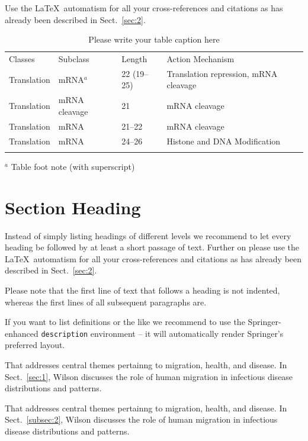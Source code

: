 \documentclass[graybox]{svmult}
\begin{document}
 Use the \LaTeX\ automatism for all your cross-refer\-ences and citations as has already been described in Sect.~\ref{sec:2}.
%
%
\begin{table}
\caption{Please write your table caption here}
\label{tab:1}       %
%
%
\begin{tabular}{p{2cm}p{2.4cm}p{2cm}p{4.9cm}}
\hline\noalign{\smallskip}
Classes & Subclass & Length & Action Mechanism  \\
\noalign{\smallskip}\svhline\noalign{\smallskip}
Translation & mRNA$^a$  & 22 (19--25) & Translation repression, mRNA cleavage\\
Translation & mRNA cleavage & 21 & mRNA cleavage\\
Translation & mRNA  & 21--22 & mRNA cleavage\\
Translation & mRNA  & 24--26 & Histone and DNA Modification\\
\noalign{\smallskip}\hline\noalign{\smallskip}
\end{tabular}
$^a$ Table foot note (with superscript)
\end{table}
%
\section{Section Heading}
\label{sec:3}
Instead of simply listing headings of different levels we recommend to
let every heading be followed by at least a short passage of text.
Further on please use the \LaTeX\ automatism for all your
cross-references and citations as has already been described in
Sect.~\ref{sec:2}.

Please note that the first line of text that follows a heading is not indented, whereas the first lines of all subsequent paragraphs are.

If you want to list definitions or the like we recommend to use the Springer-enhanced \verb|description| environment -- it will automatically render Springer's preferred layout.

\begin{description}[Type 1]
\item[Type 1]{That addresses central themes pertainng to migration, health, and disease. In Sect.~\ref{sec:1}, Wilson discusses the role of human migration in infectious disease distributions and patterns.}
\item[Type 2]{That addresses central themes pertainng to migration, health, and disease. In Sect.~\ref{subsec:2}, Wilson discusses the role of human migration in infectious disease distributions and patterns.}
\end{description}
\end{document}
